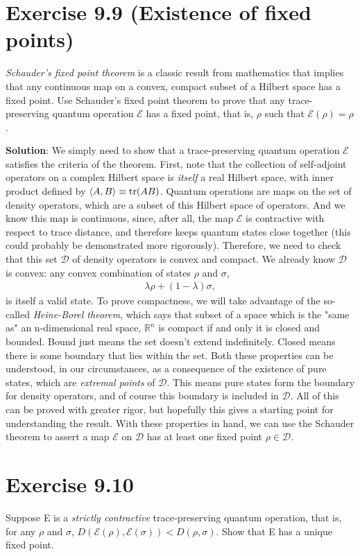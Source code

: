 \documentclass{book}
\newcommand{\mc}[1]{\mathcal{#1}}
\begin{document}
\section*{Exercise 9.9 (Existence of fixed points)} 
    \emph{Schauder's fixed point theorem} is a classic result from mathematics that implies that any continuous map on a convex, compact subset of a Hilbert space has a fixed point. Use Schauder’s fixed point theorem to prove that any trace-preserving quantum operation $\mc{E}$ has a fixed point, that is, $\rho$ such that $\mc{E}(\rho) = \rho$. 
    
    \textbf{Solution}: We simply need to show that a trace-preserving quantum operation $\mc{E}$ satisfies the criteria of the theorem. First, note that the collection of self-adjoint operators on a complex Hilbert space is \emph{itself} a real Hilbert space, with inner product defined by $\langle A, B \rangle \equiv \tr(A B)$. Quantum operations are maps on the set of density operators, which are a subset of this Hilbert space of operators. And we know this map is continuous, since, after all, the map $\mc{E}$ is contractive with respect to trace distance, and therefore keeps quantum states close together (this could probably be demonstrated more rigorously). Therefore, we need to check that this set $\mc{D}$ of density operators is convex and compact. We already know $\mc{D}$ is convex: any convex combination of states $\rho$ and $\sigma$, 
    \begin{align}
        \lambda \rho + (1-\lambda) \sigma,
    \end{align} is itself a valid state. To prove compactness, we will take advantage of the so-called \emph{Heine-Borel theorem}, which says that subset of a space which is the "same as" an n-dimensional real space, $\mathbb{R}^n$ is compact if and only it is closed and bounded. Bound just means the set doesn't extend indefinitely. Closed means there is some boundary that lies within the set. Both these properties can be understood, in our circumstances, as a consequence of the existence of pure states, which are \emph{extremal points} of $\mc{D}$. This means pure states form the boundary for density operators, and of course this boundary is included in $\mc{D}$. All of this can be proved with greater rigor, but hopefully this gives a starting point for understanding the result. With these properties in hand, we can use the Schauder theorem to assert a map $\mc{E}$ on $\mc{D}$ has at least one fixed point $\rho \in \mc{D}$.
    
\section*{Exercise 9.10}
    Suppose E is a \emph{strictly contractive} trace-preserving quantum operation, that is, for any $\rho$ and $\sigma$, $D(\mc{E}(\rho), \mc{E}(\sigma)) < D(\rho, \sigma)$. Show that E has a unique fixed point.
    
\end{document}
